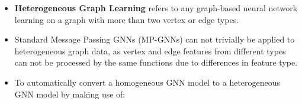 \documentclass{beamer}
\begin{document}

\begin{frame}[fragile]
\begin{itemize}
\frametitle{Heterogeneous Graph Learning}
[ball]

\item \textbf{Heterogeneous Graph Learning} refers to any graph-based neural network learning on a graph with more than two vertex or edge types.

\vspace{0.3cm}

\item Standard Message Passing GNNs (MP-GNNs) can not trivially be applied to heterogeneous graph data, as vertex and edge features from different types can not be processed by the same functions due to differences in feature type.

\vspace{0.3cm}

\item To automatically convert a homogeneous GNN model to a heterogeneous GNN model by making use of:



\end{itemize}
\end{frame}

\end{document}

